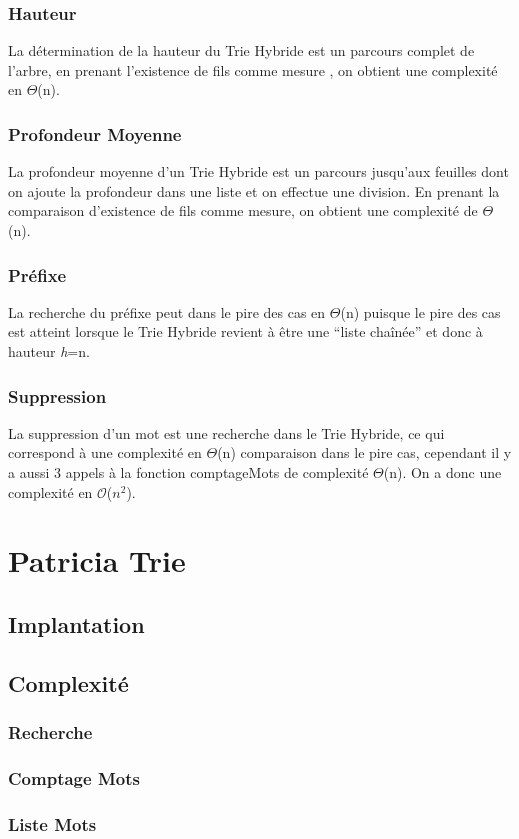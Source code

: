 \documentclass[a4paper,12pt]{report}
\begin{document}
\subsection{Hauteur}
La détermination de la hauteur du Trie Hybride est un parcours complet de l'arbre, en prenant l'existence de fils comme mesure
, on obtient une complexité en $\Theta$(n).
\subsection{Profondeur Moyenne}
La profondeur moyenne d'un Trie Hybride est un parcours jusqu'aux feuilles dont on ajoute la profondeur dans une liste et on effectue
une division. En prenant la comparaison d'existence de fils comme mesure, on obtient une complexité de $\Theta$(n).
\subsection{Préfixe}
La recherche du préfixe peut dans le pire des cas en $\Theta$(n) puisque le pire des cas est atteint lorsque le Trie Hybride
revient à être une ``liste chaînée'' et donc à hauteur \textit{h}=n.
\subsection{Suppression}
La suppression d'un mot est une recherche dans le Trie Hybride, ce qui correspond à une complexité en $\Theta$(n) comparaison
dans le pire cas, cependant il y a aussi 3 appels à la fonction comptageMots de complexité $\Theta$(n).
On a donc une complexité en $\mathcal{O}$($n^2$).
\chapter{Patricia Trie}
\section{Implantation}
\section{Complexité}
\subsection{Recherche}
\subsection{Comptage Mots}
\subsection{Liste Mots}
\end{document}
